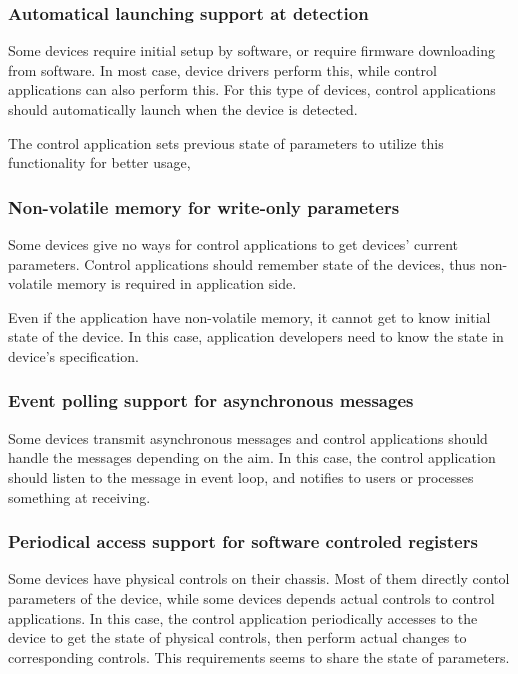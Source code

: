 \documentclass[onecolumn]{article}
\begin{document}
\subsubsection{Automatical launching support at detection}

Some devices require initial setup by software, or require firmware downloading from software. In most case, device drivers perform this, while control applications can also perform this. For this type of devices, control applications should automatically launch when the device is detected.

The control application sets previous state of parameters to utilize this functionality for better usage,


\subsubsection{Non-volatile memory for write-only parameters}

Some devices give no ways for control applications to get devices' current parameters. Control applications should remember state of the devices, thus non-volatile memory is required in application side.

Even if the application have non-volatile memory, it cannot get to know initial state of the device. In this case, application developers need to know the state in device's specification.


\subsubsection{Event polling support for asynchronous messages}

Some devices transmit asynchronous messages and control applications should handle the messages depending on the aim. In this case, the control application should listen to the message in event loop, and notifies to users or processes something at receiving.


\subsubsection{Periodical access support for software controled registers}

Some devices have physical controls on their chassis. Most of them directly contol parameters of the device, while some devices depends actual controls to control applications. In this case, the control application periodically accesses to the device to get the state of physical controls, then perform actual changes to corresponding controls. This requirements seems to share the state of parameters.
\end{document}
